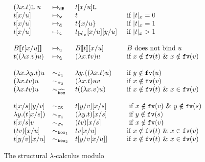 \documentclass{LMCS}
\renewcommand{\>}{\rightarrow}
\def\lam{\lambda}
\newcommand{\rRew}[1]{\mapsto_{#1}}
\newcommand{\B}{{\tt dB}}
\newcommand{\fv}[1]{{\tt fv}(#1)}
\newcommand{\Var}{{\tt d}}
\newcommand{\DSubs}{{\tt c}}
\newcommand{\Gc}{{\tt w}}
\newcommand{\CS}{{\tt CS}}
\newcommand{\set}[1]{ \{ #1 \}}
\newcommand{\unboxed}{{\tt u}}
\newcommand{\preeq}{\sim}
\newcommand{\preeqw}[1]{\sim_{#1}}
\def\rsig{\hat{\sigma}}
\newcommand{\runboxed}{\hat{\unboxed}}
\newcommand{\preeqsigu}{\preeq_{\sigma_1}}
\newcommand{\preeqsigt}{\preeq_{\sigma_2}}
\newcommand{\ctx}[2]{#1 [ \! [#2] \! ]}
\newcommand{\List}{{\tt L}}
\newcommand{\boite}{{\tt box}}
\newcommand{\sigt}{\boite_1}
\newcommand{\sigq}{\boite_2}
\newcommand{\rsigt}{\widehat{\boite}}
\begin{document}
\begin{figure}[ht]
\[\begin{array}{lll@{\hspace{.5cm}}l}
(\lam x.t)\List\ u & \rRew{\B}&  t[x/u]\List    \\
t[x/u] & \rRew{\Gc} & t &\mbox{if $|t|_x=0$}\\
t[x/u] & \rRew{\Var} & t\set{x/u} &\mbox{if $|t|_x=1$}\\
t[x/u] & \rRew{\DSubs} & t_{[y]_x}[x/u][y/u] &\mbox{if $|t|_x>1$}\\\\

\ctx{B}{t[x/u]} &  \rRew{\unboxed}   & \ctx{B}{t}[x/u] & B \mbox{ does not bind } u\\
t ((\lam x. v) u)     & \rRew{\runboxed} & (\lam x.t v) u   & \mbox{if } x \notin \fv{t}\ \&\ x\notin \fv{v}\\\\

(\lam x. \lam y.t) u & \preeqw{\rsig_1} & \lam y. ((\lam x.t) u) & \mbox{if } y\notin\fv{u}\\
(\lam x.t v) u     & \preeqw{\rsig_2} & (\lam x. t) u v    & \mbox{if } x\notin \fv{v}\\
(\lam x.t v) u     & \preeqw{\rsigt} & t ((\lam x. v) u)    & \mbox{if } x \notin \fv{t}\ \&\ x\in \fv{v}\\\\

   t[x/s][y/v] & \sim_{\CS} & t[y/v][x/s] & \mbox{ if } x\notin\fv{v}\ \&\ y\notin\fv{s}  \\
   \lam y. (t [x/s]) & \preeqsigu & (\lam y. t) [x/s]  & \mbox{ if } y\notin \fv{s} \\
   t[x/s] v & \preeqsigt & (t v)[x/s]& \mbox{ if } x\notin\fv{v} \\
(t v)[x/u]     & \preeqw{\sigt} & t v[x/u]    & 
  \mbox{if } x \notin \fv{t}\ \&\  x\in \fv{v}\\
t[y/v][x/u]    & \preeqw{\sigq} & t[y/v[x/u]] & 
  \mbox{if } x\notin \fv{t}\ \&\ x\in \fv{v}\\

\end{array}\]
\caption{\label{fig:final-calc} The structural $\lam$-calculus modulo}
\end{figure}
\end{document}
